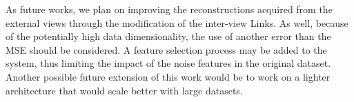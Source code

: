 As future works, we plan on improving the reconstructions acquired from the external views through the modification of the inter-view Links. As well, because of the potentially high data dimensionality, the use of another error than the MSE should be considered. A feature selection process may be added to the system, thus limiting the impact of the noise features in the original dataset. Another possible future extension of this work would be to work on a lighter architecture that would scale better with large datasets. 
